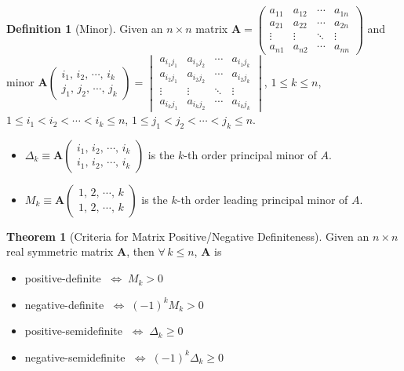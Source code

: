 \documentclass[10pt]{beamer}
\newcommand{\ds}{\displaystyle}
\newcommand{\ifff}{\;\Longleftrightarrow\;}
\theoremstyle{definition}
\newtheorem*{dfn}{Definition}
\newtheorem*{thm}{Theorem}
\newcommand{\vA}{\mathbf{A}}
\begin{document}
\begin{frame}
\begin{dfn}[Minor] 
  Given an $n\times n$ matrix $\vA = \begin{pmatrix}a_{11} & a_{12} & \cdots & a_{1n} \\ a_{21} & a_{22} & \cdots & a_{2n} \\ \vdots & \vdots & \ddots & \vdots \\ a_{n1} & a_{n2} & \cdots & a_{nn} \end{pmatrix}$ and minor $\vA\begin{pmatrix}i_1,\,i_2,\,\cdots,\,i_k\\j_1,\,j_2,\,\cdots,\,j_k\end{pmatrix} = \begin{vmatrix}a_{i_1 j_1} & a_{i_1 j_2} & \cdots & a_{i_1 j_k} \\ a_{i_2 j_1} & a_{i_2 j_2} & \cdots & a_{i_2 j_k} \\ \vdots & \vdots & \ddots & \vdots \\ a_{i_k j_1} & a_{i_k j_2} & \cdots & a_{i_k j_k} \end{vmatrix}$, $1\leqslant k\leqslant n$, $1\leqslant i_1 < i_2 < \cdots < i_k \leqslant n$, $1\leqslant j_1 < j_2 < \cdots < j_k \leqslant n$. 
  \begin{itemize}
    \item $\ds\Delta_k\equiv\vA\begin{pmatrix}i_1,\,i_2,\,\cdots,\,i_k\\i_1,\,i_2,\,\cdots,\,i_k\end{pmatrix}$ is the $k$-th order principal minor of $A$. 
    \item $\ds M_k\equiv\vA\begin{pmatrix}1,\,2,\,\cdots,\,k\\1,\,2,\,\cdots,\,k\end{pmatrix}$ is the $k$-th order leading principal minor of $A$. 
  \end{itemize}
\end{dfn}

\begin{thm}[Criteria for Matrix Positive/Negative Definiteness] 
  Given an $n\times n$ real symmetric matrix $\vA$, then $\forall\,k\leqslant n$, $\vA$ is
  \vspace{-3mm}
  \begin{multicols}{2}
    \begin{itemize}
      \item positive-definite $\ifff M_k > 0$
      \item negative-definite $\ifff (-1)^k M_k> 0$
      \item positive-semidefinite $\ifff \Delta_k \geqslant 0$
      \item negative-semidefinite $\ifff (-1)^k \Delta_k \geqslant 0$
    \end{itemize}
  \end{multicols}
\end{thm}
\end{frame}
\end{document}
